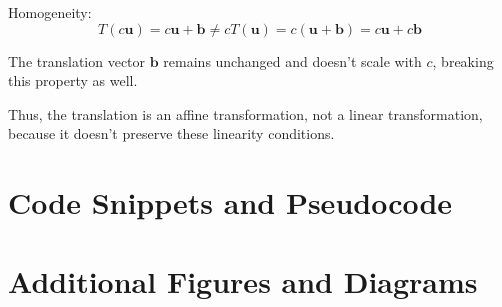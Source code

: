 \documentclass[12pt]{article}
\begin{document}
Homogeneity:
\[
    T(c\mathbf{u}) = c\mathbf{u} + \mathbf{b} \neq cT(\mathbf{u}) = c(\mathbf{u} + \mathbf{b}) = c\mathbf{u} + c\mathbf{b}
\]

The translation vector \( \mathbf{b} \) remains unchanged and doesn’t scale with \( c \), breaking this property as well.

Thus, the translation is an affine transformation, not a linear transformation, because it doesn’t preserve these linearity conditions.

\section{Code Snippets and Pseudocode}
\label{sec:appendix-code}

\section{Additional Figures and Diagrams}
\label{sec:appendix-figures}
\end{document}
